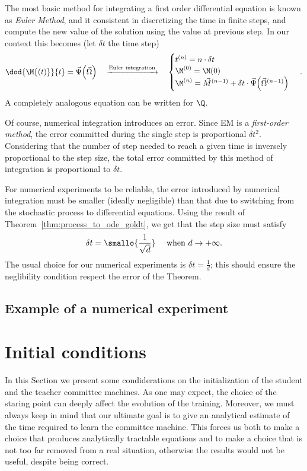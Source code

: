 The most basic method for integrating a first order differential equation is known
as \emph{Euler Method}, and it consistent in discretizing the time in finite steps,
and compute the new value of the solution using the value at previous step.
In our context this becomes (let \(\delta t\) the time step)
\[
  \dod{\M{\left(t\right)}}{t} = \vec{\Psi}{\left(\vec{\Omega}\right)}
  \quad\xrightarrow{\text{Euler integration}}\quad
  \begin{cases}
    t^{(n)} = n \cdot \delta t \\
    \M^{(0)} = \M(0) \\
    \M^{(n)} = \vec{M}^{(n-1)} + \delta t\cdot\vec{\Psi}{\left(\vec{\Omega}^{(n-1)}\right)}
  \end{cases}\,.
\]
A completely analogous equation can be written for \(\Q\).

Of course, numerical integration introduces an error.
Since EM is a \emph{first-order method},
the error committed during the single step is proportional \(\delta t^2\).
Considering that the number of step needed to reach a given time is inversely proportional
to the step size, the total error committed by this method of integration
is proportional to \(\delta t\).

For numerical experiments to be reliable, the error introduced by numerical integration
must be smaller (ideally negligible) than that due to switching from the stochastic process
to differential equations. Using the result of Theorem~\ref{thm:process_to_ode_goldt},
we get that the step size must satisfy
\[
  \delta t = \smallo{\frac{1}{\sqrt{d}}}\quad \text{ when }d\to+\infty.
\]
The usual choice for our numerical experiments is \(\delta t = \frac1d\);
this should ensure the neglibility condition respect the error of the Theorem.

\subsection{Example of a numerical experiment}

\section{Initial conditions}
In this Section we present some condiderations on the initialization of the student
and the teacher committee machines. As one may expect, the choice of the staring point 
can deeply affect the evolution of the training.
Moreover, we must always keep in mind that our ultimate goal is to give
an analytical estimate of the time required to learn the committee machine.
This forces us both to make a choice that produces analytically tractable equations
and to make a choice that is not too far removed from a real situation,
otherwise the results would not be useful, despite being correct.

